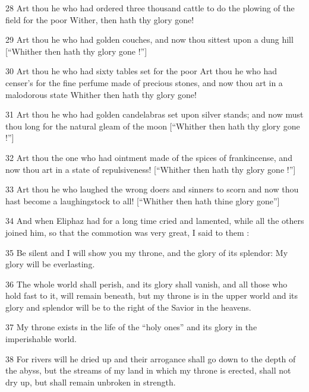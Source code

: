 \par 28 Art thou he who had ordered three thousand cattle to do the plowing of the field for the poor Wither, then hath thy glory gone!

\par 29 Art thou he who had golden couches, and now thou sittest upon a dung hill [“Whither then hath thy glory gone !”]

\par 30 Art thou he who had sixty tables set for the poor Art thou he who had censer’s for the fine perfume made of precious stones, and now thou art in a malodorous state Whither then hath thy glory gone!

\par 31 Art thou he who had golden candelabras set upon silver stands; and now must thou long for the natural gleam of the moon [“Whither then hath thy glory gone !”]

\par 32 Art thou the one who had ointment made of the spices of frankincense, and now thou art in a state of repulsiveness! [“Whither then hath thy glory gone !”]

\par 33 Art thou he who laughed the wrong doers and sinners to scorn and now thou hast become a laughingstock to all! [“Whither then hath thine glory gone”]

\par 34 And when Eliphaz had for a long time cried and lamented, while all the others joined him, so that the commotion was very great, I said to them :

\par 35 Be silent and I will show you my throne, and the glory of its splendor: My glory will be everlasting.

\par 36 The whole world shall perish, and its glory shall vanish, and all those who hold fast to it, will remain beneath, but my throne is in the upper world and its glory and splendor will be to the right of the Savior in the heavens.

\par 37 My throne exists in the life of the “holy ones” and its glory in the imperishable world.

\par 38 For rivers will he dried up and their arrogance shall go down to the depth of the abyss, but the streams of my land in which my throne is erected, shall not dry up, but shall remain unbroken in strength.

